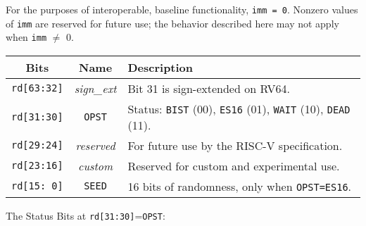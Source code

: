     For the purposes of interoperable, baseline functionality, \verb|imm = 0|.
    Nonzero values of \verb|imm| are reserved for future use; the behavior
    described here may not apply when \verb|imm| $\neq$ 0.

    \begin{center}
    \begin{tabular}{ccl}
    \toprule
    Bits    & Name  & Description \\
    \midrule
    \verb|rd[63:32]|    & {\it sign\_ext}
            & Bit 31 is sign-extended on RV64. \\
    \verb|rd[31:30]|    & \verb|OPST|
            & Status:   \verb|BIST| (00), \verb|ES16| (01),
                        \verb|WAIT| (10),   \verb|DEAD| (11). \\
    \verb|rd[29:24]|    & {\it reserved}
            & For future use by the RISC-V specification. \\
    \verb|rd[23:16]|    & {\it custom}
            & Reserved for custom and experimental use. \\
    \verb|rd[15: 0]|    & \verb|SEED|
            & 16 bits of randomness, only when \verb|OPST=ES16|.    \\
    \bottomrule
    \end{tabular}
    \end{center}

    The Status Bits at \verb|rd[31:30]|=\verb|OPST|:

